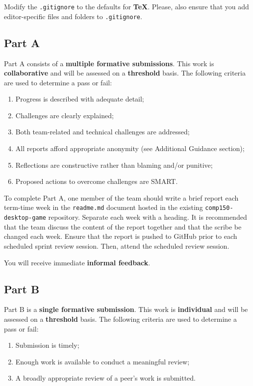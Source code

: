 \documentclass{../fal_assignment}
\begin{document}
Modify the \texttt{.gitignore} to the defaults for \textbf{TeX}. Please, also ensure that you add editor-specific files and folders to \texttt{.gitignore}. 

\subsection*{Part A}

Part A consists of a \textbf{multiple formative submissions}. This work is \textbf{collaborative} and will be assessed on a \textbf{threshold} basis. The following criteria are used to determine a pass or fail:

\begin{enumerate}[label=(\alph*)]
	\item Progress is described with adequate detail;
	\item Challenges are clearly explained;
	\item Both team-related and technical challenges are addressed;
	\item All reports afford appropriate anonymity (see Additional Guidance section);
	\item Reflections are constructive rather than blaming and/or punitive;
	\item Proposed actions to overcome challenges are SMART.
\end{enumerate}

To complete Part A, one member of the team should write a brief report each term-time week in the \texttt{readme.md} document hosted in the existing \texttt{comp150-desktop-game} repository. Separate each week with a heading. It is recommended that the team discuss the content of the report together and that the scribe be changed each week.  Ensure that the report is pushed to GitHub prior to each scheduled sprint review session. Then, attend the scheduled review session.

You will receive immediate \textbf{informal feedback}.

\subsection*{Part B}

Part B is a \textbf{single formative submission}. This work is \textbf{individual} and will be assessed on a \textbf{threshold} basis. The following criteria are used to determine a pass or fail:

\begin{enumerate}[label=(\alph*)]
	\item Submission is timely;
	\item Enough work is available to conduct a meaningful review;
	\item A broadly appropriate review of a peer's work is submitted.
\end{enumerate}
\end{document}
